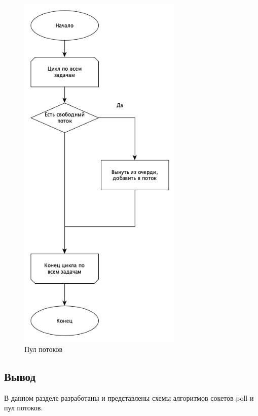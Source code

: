\begin{figure}[ht!]
	\centering
		\includegraphics[width=0.7\textwidth]{assets/graphs/thread.png}
		\caption{Пул потоков}
		\label{vlasov:trachnet:menya}
\end{figure}

\subsection*{Вывод}

В данном разделе разработаны и представлены схемы алгоритмов сокетов poll и пул потоков.